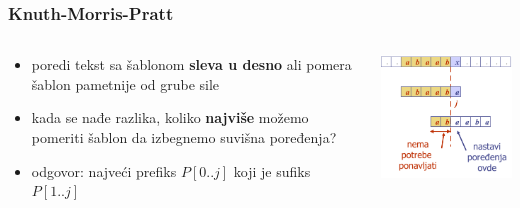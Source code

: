 \documentclass[compress]{beamer}
\begin{document}
\begin{frame}[fragile]
  \frametitle{Knuth-Morris-Pratt}
  \begin{columns}
    \begin{column}[t]{6cm}
      \begin{itemize}
        \item {} poredi tekst sa šablonom \textbf{sleva
        u desno} ali pomera šablon pametnije od grube sile
        \item kada se nađe razlika, koliko \textbf{najviše} možemo pomeriti
        šablon da izbegnemo suvišna poređenja?
        \item odgovor: najveći prefiks $P[0..j]$ koji je sufiks $P[1..j]$
      \end{itemize}
    \end{column}
    \begin{column}[t]{6cm}
      \begin{center}
        \includegraphics[width=6cm]{asp-13-pic05.png}
      \end{center}
    \end{column}
  \end{columns}
\end{frame}
\end{document}
